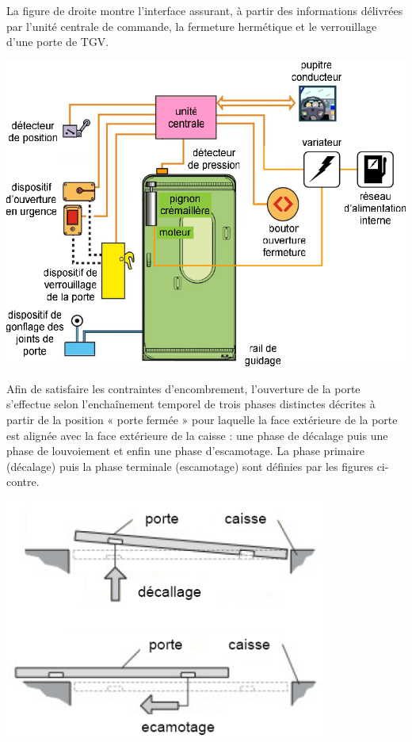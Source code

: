 \documentclass[10pt,fleqn]{article} %
\begin{document}

\vspace{8cm}
\pagestyle{fancy}
\thispagestyle{plain}


\def\columnseprulecolor{\color{ocre}}
\setlength{\columnseprule}{0.4pt} 


\begin{multicols}{2}

 La figure de droite montre l’interface assurant, à partir des informations délivrées par l’unité centrale de commande, la fermeture hermétique et le verrouillage d’une porte de TGV. 
 

\begin{center}
\includegraphics[width=.8\linewidth]{images/fig_02}
\end{center}


Afin de satisfaire les contraintes d'encombrement, l'ouverture de la porte s'effectue selon l'enchaînement temporel de trois phases distinctes décrites à partir de la position « porte fermée » pour laquelle la face extérieure de la porte est alignée avec la face extérieure de la caisse : une phase de décalage puis une phase de louvoiement et enfin une phase d'escamotage. La phase primaire (décalage) puis la phase terminale (escamotage) sont définies par les figures ci-contre. 

\begin{center}
\includegraphics[width=.6\linewidth]{images/fig_03}
\end{center}



\end{multicols}
\end{document}
